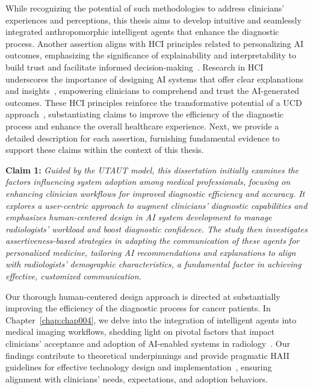 \textcolor{revised}{While recognizing the potential of such methodologies to address clinicians' experiences and perceptions, this thesis aims to develop intuitive and seamlessly integrated anthropomorphic intelligent agents that enhance the diagnostic process.
Another assertion aligns with \ac{HCI} principles related to personalizing \ac{AI} outcomes, emphasizing the significance of explainability and interpretability to build trust and facilitate informed decision-making~\cite{SHIN2021102551}.
Research in \ac{HCI} underscores the importance of designing \ac{AI} systems that offer clear explanations and insights~\cite{10.1145/3313831.3376590}, empowering clinicians to comprehend and trust the \ac{AI}-generated outcomes.
These \ac{HCI} principles reinforce the transformative potential of a \ac{UCD} approach~\cite{10.1145/3313831.3376718}, substantiating claims to improve the efficiency of the diagnostic process and enhance the overall healthcare experience.
Next, we provide a detailed description for each assertion, furnishing fundamental evidence to support these claims within the context of this thesis.}

\vspace{1.00mm}

\begin{displayquote}
{\bf Claim 1:}
{\it
\textcolor{revised}{Guided by the \ac{UTAUT} model, this dissertation initially examines the factors influencing system adoption among medical professionals, focusing on enhancing clinician workflows for improved diagnostic efficiency and accuracy.
It explores a user-centric approach to augment clinicians' diagnostic capabilities and emphasizes human-centered design in \ac{AI} system development to manage radiologists' workload and boost diagnostic confidence.
The study then investigates assertiveness-based strategies in adapting the communication of these agents for personalized medicine, tailoring \ac{AI} recommendations and explanations to align with radiologists' demographic characteristics, a fundamental factor in achieving effective, customized communication.}
}
\end{displayquote}

\vspace{1.00mm}

\textcolor{revised}{Our thorough human-centered design approach is directed at substantially improving the efficiency of the diagnostic process for cancer patients.
In Chapter~\ref{chap:chap004}, we delve into the integration of intelligent agents into medical imaging workflows, shedding light on pivotal factors that impact clinicians' acceptance and adoption of \acs{AI}-enabled systems in radiology~\cite{HUA2024102698}.
Our findings contribute to theoretical underpinnings and provide pragmatic \ac{HAII} guidelines for effective technology design and implementation~\cite{10.1145/3313831.3376301}, ensuring alignment with clinicians' needs, expectations, and adoption behaviors.}

